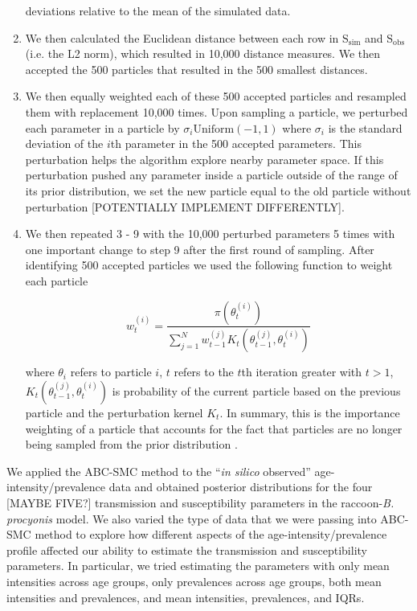 \documentclass[11pt]{article}
\begin{document}
\begin{enumerate}
  deviations relative to the mean of the simulated data.
\item
  We then calculated the Euclidean distance between each row in S$_\text{sim}$
  and S$_\text{obs}$ (i.e. the L2 norm), which resulted in 10,000 distance
  measures. We then accepted the 500 particles that resulted in the
  500 smallest distances.
\item
  We then equally weighted each of these 500 accepted particles and
  resampled them with replacement 10,000 times. Upon sampling a
  particle, we perturbed each parameter in a particle by
 $\sigma_i \text{Uniform}(-1, 1)$ where $\sigma_i$ is the standard
  deviation of the $i$th parameter in the 500 accepted parameters. This
  perturbation helps the algorithm explore nearby parameter space. If this perturbation pushed any parameter inside a particle outside of the range of its prior distribution, we set the new particle equal to the old particle without perturbation [POTENTIALLY IMPLEMENT DIFFERENTLY].
\item
  We then repeated 3 - 9 with the 10,000 perturbed parameters 5
  times with one important change to step 9 after the first round of
  sampling. After identifying 500 accepted particles we used the
  following function to weight each particle \citep{Toni2009}

  \begin{equation}
    w_t^{(i)} = \dfrac{\pi(\theta_t^{(i)})}{\sum_{j = 1}^N w_{t - 1}^{(j)} K_t(\theta_{t - 1}^{(j)}, \theta_t^{(i)})}
  \end{equation}

  where $\theta_i$ refers to particle $i$, $t$ refers to the $t$th iteration greater with $t > 1$,  $K_t(\theta_{t - 1}^{(j)}, \theta_t^{(i)})$ is probability of the current particle based on the previous particle and the perturbation kernel $K_t$. 
  In summary, this is the
  importance weighting of a particle that accounts for the fact that
  particles are no longer being sampled from the prior distribution \citep{Beaumont2010}.
\end{enumerate}

We applied the ABC-SMC method to the ``\emph{in silico} observed'' age-intensity/prevalence data and obtained posterior distributions for the four [MAYBE FIVE?]
transmission and susceptibility parameters in the raccoon-\emph{B.
procyonis} model.  We also varied the type of data that we were passing into ABC-SMC method to explore how different aspects of the age-intensity/prevalence profile affected our ability to estimate the transmission and susceptibility parameters.  In particular, we tried estimating the parameters with only mean intensities across age groups, only prevalences across age groups, both mean intensities and prevalences, and mean intensities, prevalences, and IQRs. 
\end{document}
